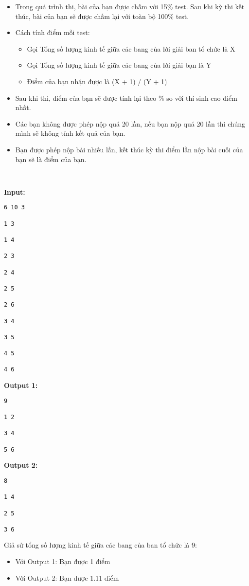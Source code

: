 \begin{itemize}
	\item Trong quá trình thi, bài của bạn được chấm với 15\% test. Sau khi kỳ  thi kết thúc, bài của bạn sẽ được chấm lại với toàn bộ 100\% test.
	\item Cách tính điểm mỗi test:        

 
\begin{itemize}
	\item Gọi Tổng số lượng kinh tế giữa các bang của lời giải ban tổ chức là X
\end{itemize}
\begin{itemize}
	\item Gọi Tổng số lượng kinh tế giữa các bang của lời giải bạn là Y
	\item Điểm của bạn nhận được là (X + 1) / (Y + 1)
\end{itemize}
	\item Sau khi thi, điểm của bạn sẽ được tính lại theo \% so với thí sinh cao điểm nhất.
	\item Các bạn không được phép nộp quá 20 lần, nếu bạn nộp quá 20 lần thì chúng mình sẽ không tính kết quả của bạn.
	\item Bạn được phép nộp bài nhiều lần, kết thúc kỳ thi điểm lần nộp bài cuối của bạn sẽ là điểm của bạn.
\end{itemize}

 
\begin{itemize}
\end{itemize}
\begin{itemize}
\end{itemize}
\textbf{Input:}
\begin{verbatim}
6 10 3

1 3

1 4

2 3

2 4

2 5

2 6

3 4

3 5

4 5

4 6\end{verbatim}

\textbf{Output 1:}
\begin{verbatim}
9

1 2

3 4

5 6\end{verbatim}

\textbf{Output 2:}
\begin{verbatim}
8

1 4

2 5

3 6\end{verbatim}

Giả sử tổng số lượng kinh tế giữa các bang của ban tổ chức là 9:
\begin{itemize}
	\item Với Output 1: Bạn được 1 điểm
	\item Với Output 2: Bạn được 1.11 điểm
\end{itemize}